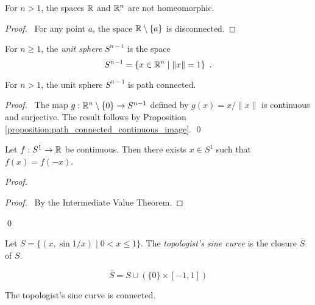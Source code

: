 \begin{corollary}
    For $n > 1$, the spaces $\mathbb{R}$ and $\mathbb{R}^n$ are not homeomorphic.
\end{corollary}

\begin{proof}
    \pf\ For any point $a$, the space $\mathbb{R} \setminus \{a\}$ is disconnected.
\end{proof}

\begin{definition}
    For $n \geq 1$, the \emph{unit sphere} $S^{n-1}$ is the space
    \[ S^{n-1} = \{ x \in \mathbb{R}^n \mid \| x \| = 1 \} \enspace . \]
\end{definition}

\begin{proposition}
    For $n > 1$, the unit sphere $S^{n-1}$ is path connected.
\end{proposition}

\begin{proof}
    \pf\ The map $g : \mathbb{R}^n \setminus \{ 0 \} \rightarrow S^{n-1}$ defined by $g(x) = x / \| x \|$ is continuous and surjective. The result follows by Proposition
    \ref{proposition:path_connected_continuous_image}. \qed
\end{proof}

\begin{proposition}
    Let $f : S^1 \rightarrow \mathbb{R}$ be continuous. Then there exists $x \in S^1$ such that $f(x) = f(-x)$.
\end{proposition}

\begin{proof}
    \pf
    \begin{proof}
        \pf\ By the Intermediate Value Theorem.
    \end{proof}
    \qed
\end{proof}

\begin{definition}
    Let $S = \{ (x, \sin 1/x) \mid 0 < x \leq 1 \}$. The \emph{topologist's sine curve} is the closure $\overline{S}$ of $S$.
\end{definition}

\begin{proposition}
    \[ \overline{S} = S \cup (\{0\} \times [-1,1]) \]
\end{proposition}
\begin{proposition}
    The topologist's sine curve is connected.
\end{proposition}

